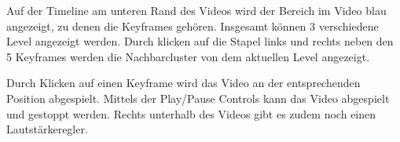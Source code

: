 \documentclass[a4paper,11pt,german]{scrartcl}
\begin{document}
Auf der Timeline am unteren Rand des Videos wird der Bereich im Video blau angezeigt, zu denen die Keyframes gehören. Insgesamt können 3 verschiedene Level angezeigt werden. Durch klicken auf die Stapel links und rechts neben den 5 Keyframes werden die Nachbarcluster von dem aktuellen Level angezeigt. 

Durch Klicken auf einen Keyframe wird das Video an der entsprechenden Position abgespielt. Mittels der Play/Pause Controls kann das Video abgespielt und gestoppt werden. Rechts unterhalb des Videos gibt es zudem noch einen Lautstärkeregler.
\end{document}
